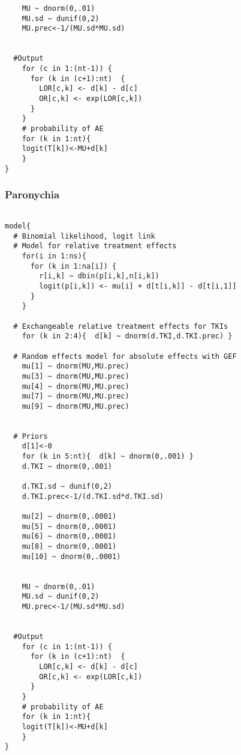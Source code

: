 \documentclass[11pt,final,fleqn]{article}\usepackage[]{graphicx}\usepackage[]{color}
\theoremstyle{plain}
\begin{document}
\begin{appendices}
\begin{verbatim}
    MU ~ dnorm(0,.01)                         
    MU.sd ~ dunif(0,2) 
    MU.prec<-1/(MU.sd*MU.sd)
    
      
  #Output                                     
    for (c in 1:(nt-1)) {                        
      for (k in (c+1):nt)  { 
        LOR[c,k] <- d[k] - d[c]
        OR[c,k] <- exp(LOR[c,k])
      }  
    }
    # probability of AE
    for (k in 1:nt){ 
    logit(T[k])<-MU+d[k]
    }
}

\end{verbatim}

\subsubsection{Paronychia}
\begin{verbatim} 

model{
  # Binomial likelihood, logit link
  # Model for relative treatment effects
    for(i in 1:ns){                  
      for (k in 1:na[i]) {               
        r[i,k] ~ dbin(p[i,k],n[i,k])     
        logit(p[i,k]) <- mu[i] + d[t[i,k]] - d[t[i,1]]  
      }
    }   
  
  # Exchangeable relative treatment effects for TKIs
    for (k in 2:4){  d[k] ~ dnorm(d.TKI,d.TKI.prec) }
  
  # Random effects model for absolute effects with GEF
    mu[1] ~ dnorm(MU,MU.prec) 
    mu[3] ~ dnorm(MU,MU.prec)
    mu[4] ~ dnorm(MU,MU.prec)
    mu[7] ~ dnorm(MU,MU.prec) 
    mu[9] ~ dnorm(MU,MU.prec) 
       
       
  # Priors
    d[1]<-0                                      
    for (k in 5:nt){  d[k] ~ dnorm(0,.001) }     
    d.TKI ~ dnorm(0,.001)
    
    d.TKI.sd ~ dunif(0,2) 
    d.TKI.prec<-1/(d.TKI.sd*d.TKI.sd)
    
    mu[2] ~ dnorm(0,.0001)                     
    mu[5] ~ dnorm(0,.0001)
    mu[6] ~ dnorm(0,.0001)
    mu[8] ~ dnorm(0,.0001)
    mu[10] ~ dnorm(0,.0001)
                     
      
    MU ~ dnorm(0,.01)                         
    MU.sd ~ dunif(0,2) 
    MU.prec<-1/(MU.sd*MU.sd)
    
      
  #Output                                        
    for (c in 1:(nt-1)) {                        
      for (k in (c+1):nt)  { 
        LOR[c,k] <- d[k] - d[c]
        OR[c,k] <- exp(LOR[c,k])
      }  
    }
    # probability of AE
    for (k in 1:nt){ 
    logit(T[k])<-MU+d[k]
    }
}


\end{verbatim}
\end{appendices}
\end{document}
